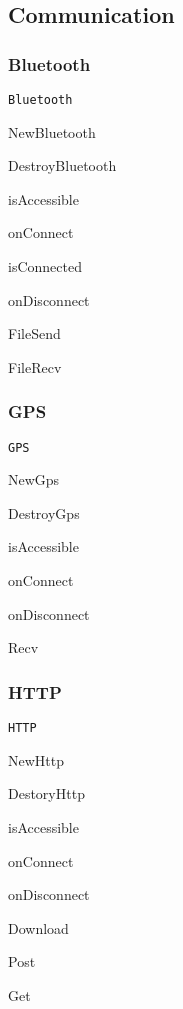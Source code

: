 \subsection*{Communication}

\subsubsection*{Bluetooth}


\begin{DoxyItemize}
\item {\tt Bluetooth}
\begin{DoxyItemize}
\item New\-Bluetooth
\item Destroy\-Bluetooth
\item is\-Accessible
\item on\-Connect
\item is\-Connected
\item on\-Disconnect
\item File\-Send
\item File\-Recv
\end{DoxyItemize}
\end{DoxyItemize}

\subsubsection*{G\-P\-S}


\begin{DoxyItemize}
\item {\tt G\-P\-S}
\begin{DoxyItemize}
\item New\-Gps
\item Destroy\-Gps
\item is\-Accessible
\item on\-Connect
\item on\-Disconnect
\item Recv
\end{DoxyItemize}
\end{DoxyItemize}

\subsubsection*{H\-T\-T\-P}


\begin{DoxyItemize}
\item {\tt H\-T\-T\-P}
\begin{DoxyItemize}
\item New\-Http
\item Destory\-Http
\item is\-Accessible
\item on\-Connect
\item on\-Disconnect
\item Download
\item Post
\item Get
\end{DoxyItemize}
\end{DoxyItemize}

